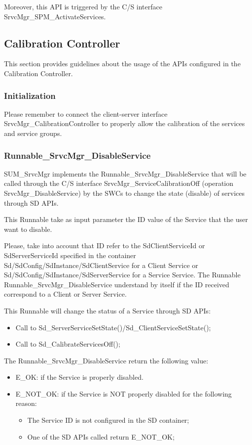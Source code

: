 Moreover, this API is triggered by the C/S interface SrvcMgr\_SPM\_ActivateServices.


\subsection{Calibration Controller}
\label{CalContr}

This section provides guidelines about the usage of the APIs configured in the Calibration Controller.

\subsubsection{Initialization}
Please remember to connect the client-server interface SrvcMgr\_CalibrationController to properly allow the calibration of the services and service groups.

\subsubsection{Runnable\_SrvcMgr\_DisableService}
SUM\_SrvcMgr implements the Runnable\_SrvcMgr\_DisableService that will be called through the C/S interface SrvcMgr\_ServiceCalibrationOff (operation SrvcMgr\_DisableService) 
by the SWCs to change the state (disable) of services through SD APIs.

This Runnable take as input parameter the ID value of the Service that the user want to disable. 

Please, take into account that ID refer to the SdClientServiceId or SdServerServiceId specified in the container Sd/SdConfig/SdInstance/SdClientService for a Client Service or 
Sd/SdConfig/SdInstance/SdServerService for a Service Service. The Runnable Runnable\_SrvcMgr\_DisableService understand by itself if the ID received correspond to a Client or Server Service.

This Runnable will change the status of a Service through SD APIs:

\begin{itemize}
\item Call to Sd\_ServerServiceSetState()/Sd\_ClientServiceSetState();
\item Call to Sd\_CalibrateServicesOff();
\end{itemize}

The Runnable\_SrvcMgr\_DisableService return the following value: 
\begin{itemize}
\item E\_OK: if the Service is properly disabled.
\item E\_NOT\_OK: if the Service is NOT properly disabled for the following reason:
\begin{itemize}
\item The Service ID is not configured in the SD container; 
\item One of the SD APIs called return E\_NOT\_OK;
\end{itemize}
\end{itemize}

